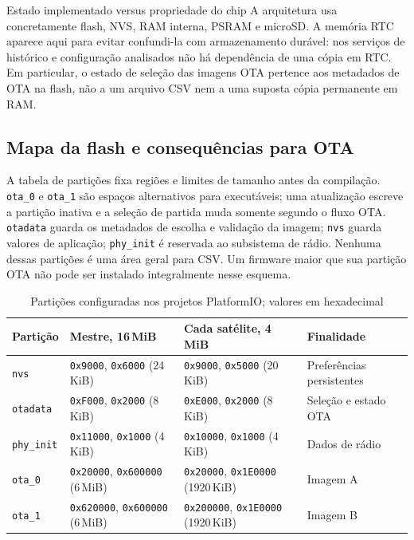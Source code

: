 \begin{nota}{Estado implementado versus propriedade do chip}
A arquitetura usa concretamente flash, NVS, RAM interna, PSRAM e microSD. A memória RTC aparece aqui para evitar confundi-la com armazenamento durável: nos serviços de histórico e configuração analisados não há dependência de uma cópia em RTC. Em particular, o estado de seleção das imagens OTA pertence aos metadados de OTA na flash, não a um arquivo CSV nem a uma suposta cópia permanente em RAM.
\end{nota}

\subsection{Mapa da flash e consequências para OTA}\label{sec:particoes_flash}
A tabela de partições fixa regiões e limites de tamanho antes da compilação. \texttt{ota\_0} e \texttt{ota\_1} são espaços alternativos para executáveis; uma atualização escreve a partição inativa e a seleção de partida muda somente segundo o fluxo OTA. \texttt{otadata} guarda os metadados de escolha e validação da imagem; \texttt{nvs} guarda valores de aplicação; \texttt{phy\_init} é reservada ao subsistema de rádio. Nenhuma dessas partições é uma área geral para CSV. Um firmware maior que sua partição OTA não pode ser instalado integralmente nesse esquema.

\begin{table}[htbp]\centering\small
\caption{Partições configuradas nos projetos PlatformIO; valores em hexadecimal}\label{tab:particoes_nexus}
\begin{tabularx}{\textwidth}{@{}lXXl@{}}\toprule
Partição & Mestre, 16\,MiB & Cada satélite, 4\,MiB & Finalidade\\\midrule
\texttt{nvs} & \texttt{0x9000}, \texttt{0x6000} (24\,KiB) & \texttt{0x9000}, \texttt{0x5000} (20\,KiB) & Preferências persistentes\\
\texttt{otadata} & \texttt{0xF000}, \texttt{0x2000} (8\,KiB) & \texttt{0xE000}, \texttt{0x2000} (8\,KiB) & Seleção e estado OTA\\
\texttt{phy\_init} & \texttt{0x11000}, \texttt{0x1000} (4\,KiB) & \texttt{0x10000}, \texttt{0x1000} (4\,KiB) & Dados de rádio\\
\texttt{ota\_0} & \texttt{0x20000}, \texttt{0x600000} (6\,MiB) & \texttt{0x20000}, \texttt{0x1E0000} (1920\,KiB) & Imagem A\\
\texttt{ota\_1} & \texttt{0x620000}, \texttt{0x600000} (6\,MiB) & \texttt{0x200000}, \texttt{0x1E0000} (1920\,KiB) & Imagem B\\\bottomrule
\end{tabularx}
\end{table}

